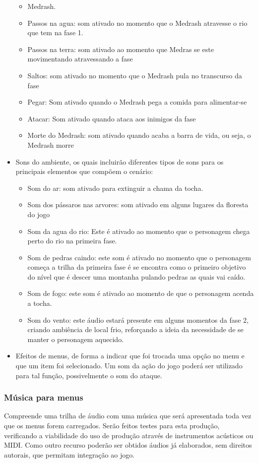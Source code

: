 \begin{itemize}
\begin{itemize}
\item Medrash.
\item Passos na agua: som ativado no momento que o Medrash atravesse o rio 
que tem na fase 1. 
\item Passos na terra: som ativado ao momento que Medras se este movimentando 
atravessando a fase 
\item Saltos: som ativado no momento que o Medrash pula no transcurso da fase
\item Pegar: Som ativado quando o Medrash pega a comida para alimentar-se
\item Atacar: Som ativado quando ataca aos inimigos da fase
\item Morte do Medrash: som ativado quando acaba a barra de vida, 
ou seja, o Medrash morre
\end{itemize}

\item Sons do ambiente, os quais incluirão diferentes tipos de sons para os
principais elementos que compõem o cenário:
\begin{itemize}
\item Som do ar: som ativado para extinguir a chama da tocha. 
\item Som dos pássaros nas arvores: som ativado em alguns lugares da floresta 
do jogo 
\item Som da agua do rio: Este é ativado ao momento que o personagem chega 
perto do rio na primeira fase.
\item Som de pedras caindo: este som é ativado no momento que o personagem 
começa a trilha da primeira fase é se encontra como o primeiro objetivo do 
nível que é descer uma montanha pulando pedras as quais vai caído.
\item Som de fogo: este som  é ativado ao momento de que o personagem 
acenda a tocha.
\item Som do vento: este áudio estará presente em alguns momentos da fase 2, 
criando ambiência de local frio, reforçando a ideia da necessidade de se 
manter o personagem aquecido.
\end{itemize}

\item Efeitos de menus, de forma a indicar que foi trocada uma opção no 
menu e que um item foi selecionado. Um som da ação do jogo poderá ser
 utilizado para tal função, possivelmente o som do ataque.
\end{itemize}

\subsubsection{Música para menus}
Compreende uma trilha de áudio com uma música que será apresentada toda
 vez que os menus forem carregados. Serão feitos testes para esta produção, 
verificando a viabilidade do uso de produção através de instrumentos
 acústicos ou MIDI. Como outro recurso poderão ser obtidos áudios já
 elaborados, sem direitos autorais, que permitam integração ao jogo.

